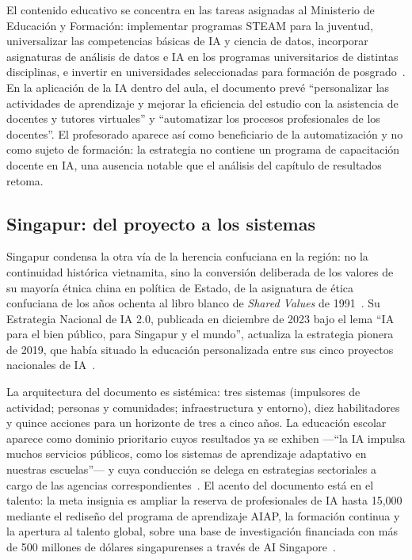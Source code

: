 El contenido educativo se concentra en las tareas asignadas al Ministerio de Educación y Formación: implementar programas STEAM para la juventud, universalizar las competencias básicas de IA y ciencia de datos, incorporar asignaturas de análisis de datos e IA en los programas universitarios de distintas disciplinas, e invertir en universidades seleccionadas para formación de posgrado~\citep{vietnam2021ai}. En la aplicación de la IA dentro del aula, el documento prevé ``personalizar las actividades de aprendizaje y mejorar la eficiencia del estudio con la asistencia de docentes y tutores virtuales'' y ``automatizar los procesos profesionales de los docentes''. El profesorado aparece así como beneficiario de la automatización y no como sujeto de formación: la estrategia no contiene un programa de capacitación docente en IA, una ausencia notable que el análisis del capítulo de resultados retoma.

\subsection{Singapur: del proyecto a los sistemas}
\label{subsec:singapur}

Singapur condensa la otra vía de la herencia confuciana en la región: no la continuidad histórica vietnamita, sino la conversión deliberada de los valores de su mayoría étnica china en política de Estado, de la asignatura de ética confuciana de los años ochenta al libro blanco de \textit{Shared Values} de 1991~\citep{chia2011elusive, tan2012shared}. Su Estrategia Nacional de IA 2.0, publicada en diciembre de 2023 bajo el lema ``IA para el bien público, para Singapur y el mundo'', actualiza la estrategia pionera de 2019, que había situado la educación personalizada entre sus cinco proyectos nacionales de IA~\citep{singapore2019nais, singapore2023nais2}.

La arquitectura del documento es sistémica: tres sistemas (impulsores de actividad; personas y comunidades; infraestructura y entorno), diez habilitadores y quince acciones para un horizonte de tres a cinco años. La educación escolar aparece como dominio prioritario cuyos resultados ya se exhiben —``la IA impulsa muchos servicios públicos, como los sistemas de aprendizaje adaptativo en nuestras escuelas''— y cuya conducción se delega en estrategias sectoriales a cargo de las agencias correspondientes~\citep{singapore2023nais2}. El acento del documento está en el talento: la meta insignia es ampliar la reserva de profesionales de IA hasta 15,000 mediante el rediseño del programa de aprendizaje AIAP, la formación continua y la apertura al talento global, sobre una base de investigación financiada con más de 500 millones de dólares singapurenses a través de AI Singapore~\citep{singapore2023nais2}.

